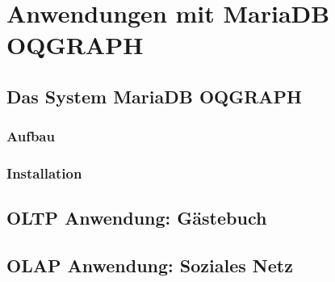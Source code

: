\chapter{Anwendungen mit MariaDB OQGRAPH}
\section{Das System MariaDB OQGRAPH}
\subsection{Aufbau}
\subsection{Installation}
\section{OLTP Anwendung: Gästebuch}
\section{OLAP Anwendung: Soziales Netz}
